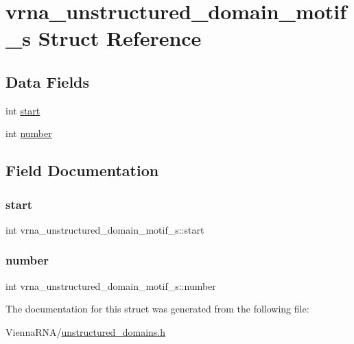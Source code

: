 \hypertarget{structvrna__unstructured__domain__motif__s}{}\section{vrna\+\_\+unstructured\+\_\+domain\+\_\+motif\+\_\+s Struct Reference}
\label{structvrna__unstructured__domain__motif__s}
\subsection*{Data Fields}
\begin{DoxyCompactItemize}
\item 
int \mbox{\hyperlink{structvrna__unstructured__domain__motif__s_ad8dbd95d790d17bcf80597b7a27cef79}{start}}
\item 
int \mbox{\hyperlink{structvrna__unstructured__domain__motif__s_aee5d1fcdd26894faa5f7defb9cf99033}{number}}
\end{DoxyCompactItemize}


\subsection{Field Documentation}
\mbox{\label{structvrna__unstructured__domain__motif__s_ad8dbd95d790d17bcf80597b7a27cef79}} 
\subsubsection{\texorpdfstring{start}{start}}
{\footnotesize\ttfamily int vrna\+\_\+unstructured\+\_\+domain\+\_\+motif\+\_\+s\+::start}

\mbox{\label{structvrna__unstructured__domain__motif__s_aee5d1fcdd26894faa5f7defb9cf99033}} 
\subsubsection{\texorpdfstring{number}{number}}
{\footnotesize\ttfamily int vrna\+\_\+unstructured\+\_\+domain\+\_\+motif\+\_\+s\+::number}



The documentation for this struct was generated from the following file\+:\begin{DoxyCompactItemize}
\item 
Vienna\+R\+N\+A/\mbox{\hyperlink{unstructured__domains_8h}{unstructured\+\_\+domains.\+h}}\end{DoxyCompactItemize}

